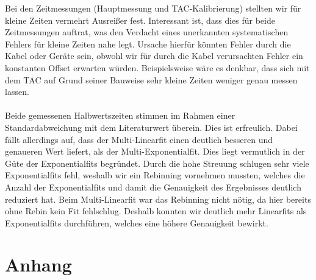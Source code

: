 \documentclass[12pt]{article}
\begin{document}
Bei den Zeitmessungen (Hauptmessung und TAC-Kalibrierung) stellten wir für kleine Zeiten vermehrt Ausreißer fest. Interessant ist, dass dies für beide Zeitmessungen auftrat, was den Verdacht eines unerkannten systematischen Fehlers für kleine Zeiten nahe legt. Ursache hierfür könnten Fehler durch die Kabel oder Geräte sein, obwohl wir für durch die Kabel verursachten Fehler ein konstanten Offset erwarten würden. Beispielsweise wäre es denkbar, dass sich mit dem TAC auf Grund seiner Bauweise sehr kleine Zeiten weniger genau messen lassen.
\\\ \\
Beide gemessenen Halbwertszeiten stimmen im Rahmen einer Standardabweichung mit dem Literaturwert überein. Dies ist erfreulich.
Dabei fällt allerdings auf, dass der Multi-Linearfit einen deutlich besseren und genaueren Wert liefert, als der Multi-Exponentialfit. Dies liegt vermutlich in der Güte der Exponentialfits begründet. Durch die hohe Streuung schlugen sehr viele Exponentialfits fehl, weshalb wir ein Rebinning vornehmen mussten, welches die Anzahl der Exponentialfits und damit die Genauigkeit des Ergebnisses deutlich reduziert hat. Beim Multi-Linearfit war das Rebinning nicht nötig, da hier bereits ohne Rebin kein Fit fehlschlug. Deshalb konnten wir deutlich mehr Linearfits als Exponentialfits durchführen, welches eine höhere Genauigkeit bewirkt.

\newpage
\section{Anhang}
\end{document}
